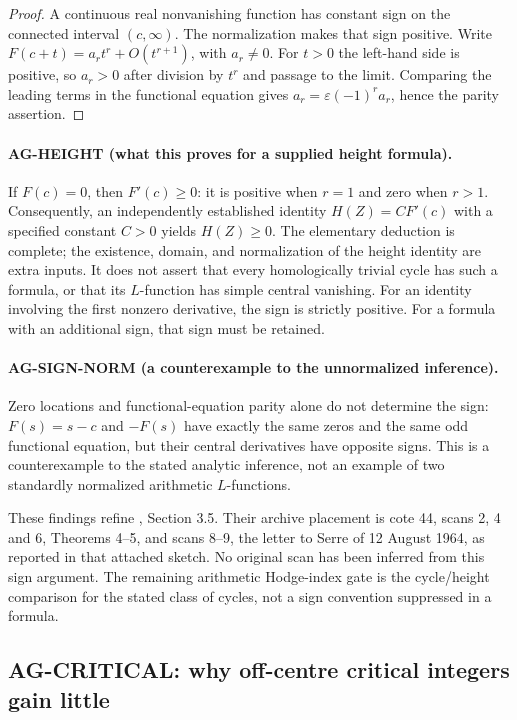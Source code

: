 \documentclass[11pt,a4paper]{article}
\begin{document}
\begin{proof}
A continuous real nonvanishing function has constant sign on the connected
interval $(c,\infty)$. The normalization makes that sign positive.
Write $F(c+t)=a_rt^r+O(t^{r+1})$, with $a_r\ne0$. For $t>0$ the
left-hand side is positive, so $a_r>0$ after division by $t^r$ and passage
to the limit. Comparing the leading terms in the functional equation gives
$a_r=\varepsilon(-1)^r a_r$, hence the parity assertion.
\end{proof}

\paragraph{AG-HEIGHT (what this proves for a supplied height formula).}
If $F(c)=0$, then $F'(c)\ge0$: it is positive when $r=1$ and zero when
$r>1$. Consequently, an independently established identity
$H(Z)=C F'(c)$ with a specified constant $C>0$ yields $H(Z)\ge0$.
The elementary deduction is complete; the existence, domain, and
normalization of the height identity are extra inputs. It does not assert
that every homologically trivial cycle has such a formula, or that its
$L$-function has simple central vanishing. For an identity involving the
first nonzero derivative, the sign is strictly positive. For a formula with
an additional sign, that sign must be retained.

\paragraph{AG-SIGN-NORM (a counterexample to the unnormalized inference).}
Zero locations and functional-equation parity alone do not determine the
sign: $F(s)=s-c$ and $-F(s)$ have exactly the same zeros and the same odd
functional equation, but their central derivatives have opposite signs.
This is a counterexample to the stated analytic inference, not an example
of two standardly normalized arithmetic $L$-functions.

These findings refine ,
Section 3.5. Their archive placement is cote 44, scans 2, 4 and 6,
Theorems 4--5, and scans 8--9, the letter to Serre of 12 August 1964,
as reported in that attached sketch. No original scan has been inferred
from this sign argument. The remaining arithmetic Hodge-index gate is
the cycle/height comparison for the stated class of cycles, not a sign
convention suppressed in a formula.

\subsection{AG-CRITICAL: why off-centre critical integers gain little}
\label{ag:critical}
\end{document}
